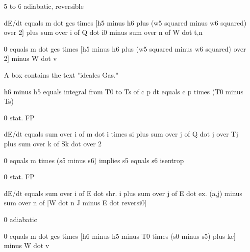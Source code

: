 5 to 6 adiabatic, reversible

dE/dt equals m dot ges times [h5 minus h6 plus (w5 squared minus w6 squared) over 2] plus sum over i of Q dot i0 minus sum over n of W dot t,n

0 equals m dot ges times [h5 minus h6 plus (w5 squared minus w6 squared) over 2] minus W dot v

A box contains the text "ideales Gas."

h6 minus h5 equals integral from T0 to Ts of c p dt equals c p times (T0 minus Ts)

0 stat. FP

dE/dt equals sum over i of m dot i times si plus sum over j of Q dot j over Tj plus sum over k of Sk dot over 2

0 equals m times (s5 minus s6) implies s5 equals s6 isentrop

0 stat. FP

dE/dt equals sum over i of E dot shr. i plus sum over j of E dot ex. (a,j) minus sum over n of [W dot n J minus E dot reversi0]

0 adiabatic

0 equals m dot ges times [h6 minus h5 minus T0 times (s0 minus s5) plus ke] minus W dot v